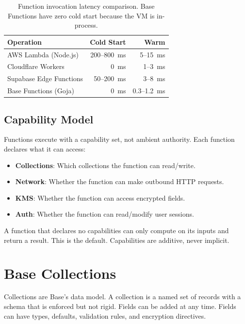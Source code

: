 \documentclass[11pt]{article}
\begin{document}
\begin{table}[H]
\centering
\small
\begin{tabular}{lrr}
\toprule
\textbf{Operation} & \textbf{Cold Start} & \textbf{Warm} \\
\midrule
AWS Lambda (Node.js) & 200--800~ms & 5--15~ms \\
Cloudflare Workers & 0~ms & 1--3~ms \\
Supabase Edge Functions & 50--200~ms & 3--8~ms \\
Base Functions (Goja) & 0~ms & 0.3--1.2~ms \\
\bottomrule
\end{tabular}
\caption{Function invocation latency comparison. Base Functions have zero cold start because the VM is in-process.}
\label{tab:coldstart}
\end{table}

\subsection{Capability Model}

Functions execute with a capability set, not ambient authority. Each function
declares what it can access:

\begin{itemize}[leftmargin=1.1em]
    \item \textbf{Collections}: Which collections the function can read/write.
    \item \textbf{Network}: Whether the function can make outbound HTTP requests.
    \item \textbf{KMS}: Whether the function can access encrypted fields.
    \item \textbf{Auth}: Whether the function can read/modify user sessions.
\end{itemize}

A function that declares no capabilities can only compute on its inputs and
return a result. This is the default. Capabilities are additive, never
implicit.

\section{Base Collections}
\label{sec:collections}

Collections are Base's data model. A collection is a named set of records with
a schema that is enforced but not rigid. Fields can be added at any time.
Fields can have types, defaults, validation rules, and encryption directives.
\end{document}

